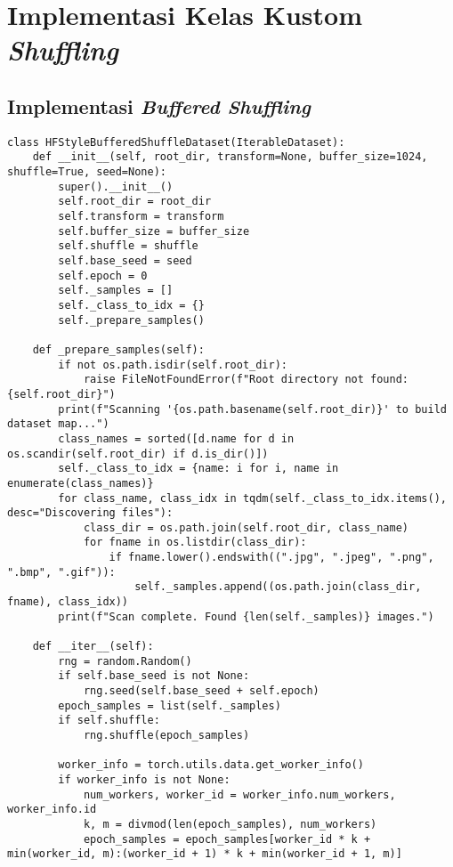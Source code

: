 \chapter{Implementasi Kelas Kustom \textit{Shuffling}}
\label{sec:implementasishuffler}

\lstset{
  frame=single,
  breaklines=true,
  basicstyle=\ttfamily\small,
  tabsize=4
}

\section{Implementasi \textit{Buffered Shuffling}}
\vspace{1.5pt}
\begin{lstlisting}
class HFStyleBufferedShuffleDataset(IterableDataset):
    def __init__(self, root_dir, transform=None, buffer_size=1024, shuffle=True, seed=None):
        super().__init__()
        self.root_dir = root_dir
        self.transform = transform
        self.buffer_size = buffer_size
        self.shuffle = shuffle
        self.base_seed = seed
        self.epoch = 0
        self._samples = []
        self._class_to_idx = {}
        self._prepare_samples()

    def _prepare_samples(self):
        if not os.path.isdir(self.root_dir):
            raise FileNotFoundError(f"Root directory not found: {self.root_dir}")
        print(f"Scanning '{os.path.basename(self.root_dir)}' to build dataset map...")
        class_names = sorted([d.name for d in os.scandir(self.root_dir) if d.is_dir()])
        self._class_to_idx = {name: i for i, name in enumerate(class_names)}
        for class_name, class_idx in tqdm(self._class_to_idx.items(), desc="Discovering files"):
            class_dir = os.path.join(self.root_dir, class_name)
            for fname in os.listdir(class_dir):
                if fname.lower().endswith((".jpg", ".jpeg", ".png", ".bmp", ".gif")):
                    self._samples.append((os.path.join(class_dir, fname), class_idx))
        print(f"Scan complete. Found {len(self._samples)} images.")

    def __iter__(self):
        rng = random.Random()
        if self.base_seed is not None:
            rng.seed(self.base_seed + self.epoch)
        epoch_samples = list(self._samples)
        if self.shuffle:
            rng.shuffle(epoch_samples)

        worker_info = torch.utils.data.get_worker_info()
        if worker_info is not None:
            num_workers, worker_id = worker_info.num_workers, worker_info.id
            k, m = divmod(len(epoch_samples), num_workers)
            epoch_samples = epoch_samples[worker_id * k + min(worker_id, m):(worker_id + 1) * k + min(worker_id + 1, m)]
        

\end{lstlisting}
